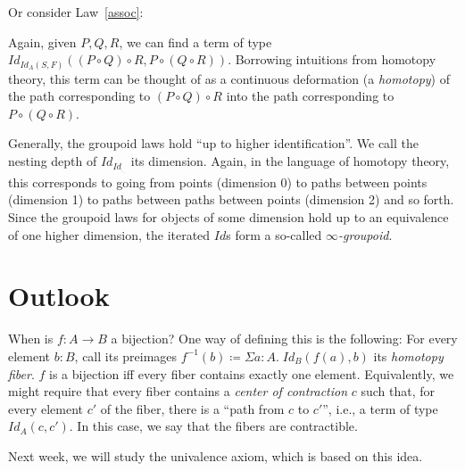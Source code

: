\documentclass{article} \usepackage{chtt-notes} \usepackage{stmaryrd}
\begin{document}
Or consider Law~\ref{assoc}:
\begin{center}\end{center}
Again, given $P, Q, R$, we can find a term of type $\mathit{Id}_{\mathit{Id}_A(S, F)}((P \circ Q) \circ R, P \circ (Q \circ R))$.
Borrowing intuitions from homotopy theory, this term can be thought of as a continuous deformation (a \emph{homotopy}) of the path corresponding to $(P \circ Q) \circ R$ into the path corresponding to $P \circ (Q \circ R)$.

Generally, the groupoid laws hold ``up to higher identification''.
We call the nesting depth of $\mathit{Id}_{\mathit{Id}_{._{._{.}}}}$ its dimension.
Again, in the language of homotopy theory, this corresponds to going from points (dimension 0) to paths between points (dimension 1) to paths between paths between points (dimension 2) and so forth.
Since the groupoid laws for objects of some dimension hold up to an equivalence of one higher dimension, the iterated $\mathit{Id}$s form a so-called \emph{$\infty$-groupoid}.

\section{Outlook}
When is $f : A \to B$ a bijection?
One way of defining this is the following:
For every element $b : B$, call its preimages $f^{-1}(b) \coloneqq \Sigma a: A. \; \mathit{Id}_{B}(f(a), b)$ its \emph{homotopy fiber}.
$f$ is a bijection iff every fiber contains exactly one element.
Equivalently, we might require that every fiber contains a \emph{center of contraction} $c$ such that, for every element $c'$ of the fiber, there is a ``path from $c$ to $c'$'', i.e., a term of type $\mathit{Id}_A(c, c')$.
In this case, we say that the fibers are contractible.

Next week, we will study the univalence axiom, which is based on this idea.
\end{document}
